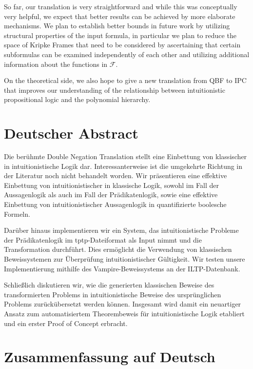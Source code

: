 \documentclass[a4paper,11pt]{report}
\theoremstyle{definition}
\theoremstyle{definition}
\theoremstyle{definition}
\theoremstyle{definition}
\theoremstyle{definition}
\theoremstyle{definition}
\theoremstyle{definition}
\begin{document}
	So far, our translation is very straightforward and while this was conceptually very helpful, we expect that better results can be achieved by more elaborate mechanisms.	We plan to establish better bounds in future work by utilizing structural properties of the input formula, in particular we plan to reduce the space of Kripke Frames that need to be considered by ascertaining that certain subformulas can be examined independently of each other and utilizing additional information about the functions in $\mathcal F$.
	
	On the theoretical side, we also hope to give a new translation from QBF to IPC that improves our understanding of the relationship between intuitionistic propositional logic and the polynomial hierarchy.
	
	

	\appendix
	
	\chapter{Deutscher Abstract}
	
	Die berühmte Double Negation Translation stellt eine Einbettung von klassischer in intuitionistische Logik dar. Interessanterweise ist die umgekehrte Richtung in der Literatur noch nicht behandelt worden. Wir präsentieren eine effektive Einbettung von intuitionistischer in klassische Logik, sowohl im Fall der Aussagenlogik als auch im Fall der Prädikatenlogik, sowie eine effektive Einbettung von intuitionistischer Aussagenlogik in quantifizierte boolesche Formeln.
	
	Darüber hinaus implementieren wir ein System, das intuitionistische Probleme der Prädikatenlogik im tptp-Dateiformat als Input nimmt und die Transformation durchführt. Dies ermöglicht die Verwendung von klassischen Beweissystemen zur Überprüfung intuitionistischer Gültigkeit. Wir testen unsere Implementierung mithilfe des Vampire-Beweissystems an der ILTP-Datenbank.
	
	Schließlich diskutieren wir, wie die generierten klassischen Beweise des transformierten Problems in intuitionistische Beweise des ursprünglichen Problems zurückübersetzt werden können. Insgesamt wird damit ein neuartiger Ansatz zum automatisiertem Theorembeweis für intuitionistische Logik etabliert und ein erster Proof of Concept erbracht.
	
	\chapter{Zusammenfassung auf Deutsch}
	
\end{document}

